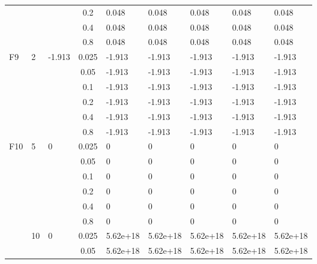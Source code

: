\begin{longtable}{|l|l|l|c|l|l|l|l|l|}
\cmidrule{4-9} &     &          & 0.2            & 0.048      & 0.048      & 0.048      & 0.048      & 0.048      \\
\cmidrule{4-9} &     &          & 0.4            & 0.048      & 0.048      & 0.048      & 0.048      & 0.048      \\
\cmidrule{4-9} &     &          & 0.8            & 0.048      & 0.048      & 0.048      & 0.048      & 0.048      \\ \midrule
F9             & 2   & -1.913   & 0.025          & -1.913     & -1.913     & -1.913     & -1.913     & -1.913     \\
\cmidrule{4-9} &     &          & 0.05           & -1.913     & -1.913     & -1.913     & -1.913     & -1.913     \\
\cmidrule{4-9} &     &          & 0.1            & -1.913     & -1.913     & -1.913     & -1.913     & -1.913     \\
\cmidrule{4-9} &     &          & 0.2            & -1.913     & -1.913     & -1.913     & -1.913     & -1.913     \\
\cmidrule{4-9} &     &          & 0.4            & -1.913     & -1.913     & -1.913     & -1.913     & -1.913     \\
\cmidrule{4-9} &     &          & 0.8            & -1.913     & -1.913     & -1.913     & -1.913     & -1.913     \\ \midrule
F10            & 5   & 0        & 0.025          & 0          & 0          & 0          & 0          & 0          \\
\cmidrule{4-9} &     &          & 0.05           & 0          & 0          & 0          & 0          & 0          \\
\cmidrule{4-9} &     &          & 0.1            & 0          & 0          & 0          & 0          & 0          \\
\cmidrule{4-9} &     &          & 0.2            & 0          & 0          & 0          & 0          & 0          \\
\cmidrule{4-9} &     &          & 0.4            & 0          & 0          & 0          & 0          & 0          \\
\cmidrule{4-9} &     &          & 0.8            & 0          & 0          & 0          & 0          & 0          \\
\cmidrule{2-9} & 10  & 0        & 0.025          & 5.62e+18   & 5.62e+18   & 5.62e+18   & 5.62e+18   & 5.62e+18   \\
\cmidrule{4-9} &     &          & 0.05           & 5.62e+18   & 5.62e+18   & 5.62e+18   & 5.62e+18   & 5.62e+18   \\

\end{longtable}
